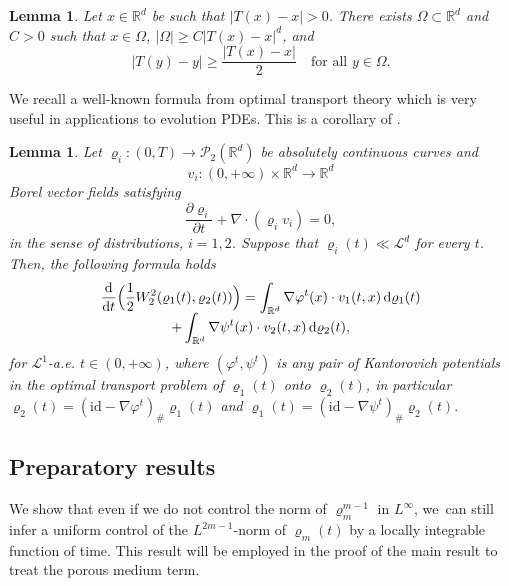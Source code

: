 \documentclass[11pt]{article}
\numberwithin{equation}{section}
\newcommand{\Bprt}[1]{\Bigl(#1\Bigr)}
\newcommand{\curlyL}{\mathcal{L}}
\newcommand{\partialt}[1]{\dfrac{\partial#1}{\partial t}}
\newcommand{\dx}[1]{\mathop{}\!\mathrm{d} #1}
\newcommand{\ddt}{\frac{\dx{}}{\dx{t}}}
\newcommand{\R}{\mathbb{R}}
\theoremstyle{plain}
\newtheorem{lemma}[theorem]{Lemma}
\theoremstyle{remark}
\begin{document}
\begin{lemma}\label{lemma 1}
Let $x\in \R^d$ be such that $|T(x)-x|>0$. There exists $\Omega\subset\R^d$ and $C>0$ such that $x\in \Omega$, $|\Omega|\geq C |T(x)-x|^d$, and
\begin{equation*}
|T(y)-y|\geq \frac{|T(x)-x|}{2} \quad \text{for all } y\in \Omega.
\end{equation*}
\end{lemma}

We recall a well-known formula from optimal transport theory which is very useful in applications to evolution PDEs. This is a corollary of \cite[Th.\,8.4.7]{AGS2008}.
\begin{lemma}
Let $\varrho_i : (0,T)\to\mathcal{P}_2(\R^d)$ be absolutely continuous curves and
\[
v_i: (0,+\infty) \times \R^d \to \R^d
\]
Borel vector fields satisfying
\begin{equation*}
\partialt{\varrho_i} +\nabla\cdot(\varrho_i v_i)=0,
\end{equation*}
in the sense of distributions, $i=1,2$. Suppose that $\varrho_i(t) \ll \curlyL^d$ for every $t$.
Then, the following formula holds
\begin{multline}\label{recall_ dt W_2}
\ddt \Bprt{\frac 12 W_2^2(\varrho_1(t), \varrho_2(t))} = \int_{\R^d} \nabla \varphi^t(x) \cdot v_1(t,x) \dx{\varrho_1(t)}\\[-5pt]
+ \int_{\R^d} \nabla \psi^t(x) \cdot v_2(t,x) \dx{\varrho_2(t)},
\end{multline}
for $\mathcal{L}^1$-a.e. $t\in (0,+\infty)$, where $(\varphi^t,\psi^t)$ is any pair of Kantorovich potentials in the optimal transport problem of $\varrho_1(t)$ onto $\varrho_2(t)$, in particular $\varrho_2(t) = (\mathrm{id} - \nabla\varphi^t)_\#\varrho_1(t)$ and $\varrho_1(t) = (\mathrm{id} - \nabla\psi^t)_\#\varrho_2(t).$
\end{lemma}

\subsection{Preparatory results}

We show that even if we do not control the norm of $\varrho_m^{m-1}$ in $L^\infty$, we~can still infer a uniform control of the $L^{2m-1}$-norm of $\varrho_m(t)$ by a locally integrable function of time. This result will be employed in the proof of the main result to treat the porous medium term.
\end{document}
